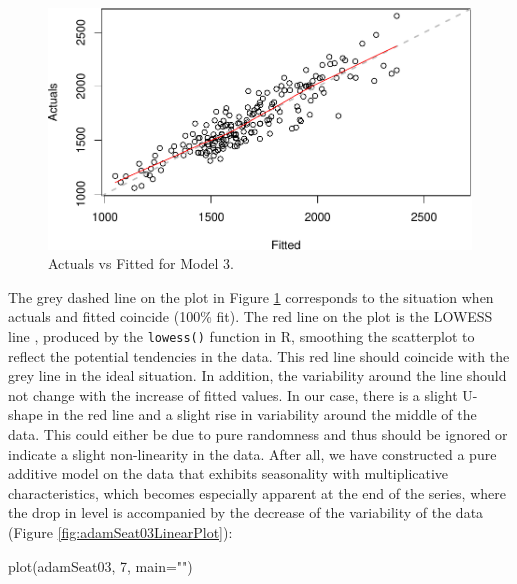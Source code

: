 \documentclass[
]{book}
\newenvironment{Shaded}{\begin{snugshade}}{\end{snugshade}}
\newcommand{\AttributeTok}[1]{\textcolor[rgb]{0.77,0.63,0.00}{#1}}
\newcommand{\DecValTok}[1]{\textcolor[rgb]{0.00,0.00,0.81}{#1}}
\newcommand{\FunctionTok}[1]{\textcolor[rgb]{0.00,0.00,0.00}{#1}}
\newcommand{\NormalTok}[1]{#1}
\newcommand{\StringTok}[1]{\textcolor[rgb]{0.31,0.60,0.02}{#1}}
\theoremstyle{definition}
\theoremstyle{definition}
\theoremstyle{definition}
\theoremstyle{definition}
\theoremstyle{remark}
\begin{document}
\begin{figure}
\centering
\includegraphics{Svetunkov--2022----ADAM_files/figure-latex/adamSeat03ActualsFitted-1.pdf}
\caption{\label{fig:adamSeat03ActualsFitted}Actuals vs Fitted for Model 3.}
\end{figure}

The grey dashed line on the plot in Figure \ref{fig:adamSeat03ActualsFitted} corresponds to the situation when actuals and fitted coincide (100\% fit). The red line on the plot is the LOWESS line \citep{Cleveland1979}, produced by the \texttt{lowess()} function in R, smoothing the scatterplot to reflect the potential tendencies in the data. This red line should coincide with the grey line in the ideal situation. In addition, the variability around the line should not change with the increase of fitted values. In our case, there is a slight U-shape in the red line and a slight rise in variability around the middle of the data. This could either be due to pure randomness and thus should be ignored or indicate a slight non-linearity in the data. After all, we have constructed a pure additive model on the data that exhibits seasonality with multiplicative characteristics, which becomes especially apparent at the end of the series, where the drop in level is accompanied by the decrease of the variability of the data (Figure \ref{fig:adamSeat03LinearPlot}):

\begin{Shaded}
\begin{Highlighting}[]
\FunctionTok{plot}\NormalTok{(adamSeat03, }\DecValTok{7}\NormalTok{, }\AttributeTok{main=}\StringTok{""}\NormalTok{)}
\end{Highlighting}
\end{Shaded}
\end{document}
